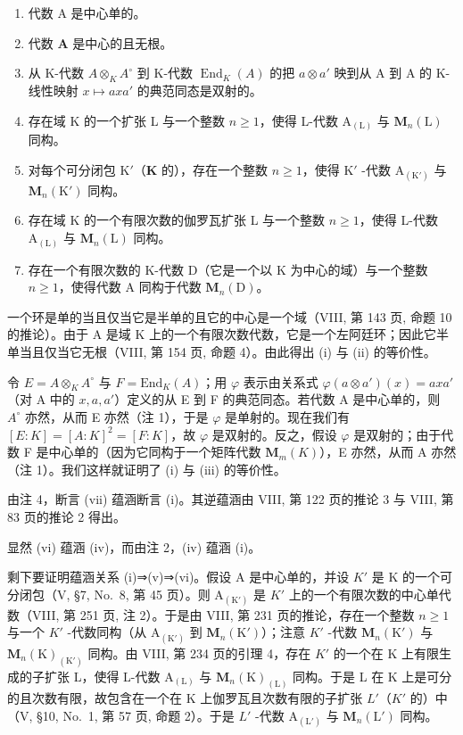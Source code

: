 \begin{enumerate}
\def\labelenumi{(\roman{enumi})}
\item
  代数 A 是中心单的。
\item
  代数 \(\mathbf{A}\) 是中心的且无根。
\item
  从 K-代数 \(A \otimes_{K} A^{\circ}\) 到 K-代数 \(\operatorname{End}_{K}(A)\) 的把 \(a \otimes a'\) 映到从 A 到 A 的 K-线性映射 \(x \mapsto axa'\) 的典范同态是双射的。
\item
  存在域 K 的一个扩张 L 与一个整数 \(n \geqslant 1\)，使得 L-代数 \(\mathrm{A}_{(\mathrm{L})}\) 与 \(\mathbf{M}_{n}(\mathrm{L})\) 同构。
\item
  对每个可分闭包 \(\mathrm{K}'\)（\(\mathbf{K}\) 的），存在一个整数 \(n \geqslant 1\)，使得 \(\mathrm{K}'\) -代数 \(\mathrm{A}_{(\mathrm{K}')}\) 与 \(\mathbf{M}_n(\mathrm{K}')\) 同构。
\item
  存在域 K 的一个有限次数的伽罗瓦扩张 L 与一个整数 \(n \geqslant 1\)，使得 L-代数 \(\mathrm{A}_{(\mathrm{L})}\) 与 \(\mathbf{M}_n(\mathrm{L})\) 同构。
\item
  存在一个有限次数的 K-代数 D（它是一个以 K 为中心的域）与一个整数 \(n \geqslant 1\)，使得代数 A 同构于代数 \(\mathbf{M}_{n}(\mathrm{D})\)。
\end{enumerate}

一个环是单的当且仅当它是半单的且它的中心是一个域（VIII, 第 143 页, 命题 10 的推论）。由于 A 是域 K 上的一个有限次数代数，它是一个左阿廷环；因此它半单当且仅当它无根（VIII, 第 154 页, 命题 4）。由此得出 (i) 与 (ii) 的等价性。

令 \(E = A \otimes_{K} A^{\circ}\) 与 \(F = \text{End}_{K}(A)\)；用 \(\varphi\) 表示由关系式 \(\varphi(a \otimes a')(x) = axa'\)（对 A 中的 \(x, a, a'\)）定义的从 E 到 F 的典范同态。若代数 A 是中心单的，则 \(A^{\circ}\) 亦然，从而 E 亦然（注 1），于是 \(\varphi\) 是单射的。现在我们有 \([E : K] = [A : K]^{2} = [F : K]\)，故 \(\varphi\) 是双射的。反之，假设 \(\varphi\) 是双射的；由于代数 F 是中心单的（因为它同构于一个矩阵代数 \(\mathbf{M}_{m}(K)\)），E 亦然，从而 A 亦然（注 1）。我们这样就证明了 (i) 与 (iii) 的等价性。

由注 4，断言 (vii) 蕴涵断言 (i)。其逆蕴涵由 VIII, 第 122 页的推论 3 与 VIII, 第 83 页的推论 2 得出。

显然 (vi) 蕴涵 (iv)，而由注 2，(iv) 蕴涵 (i)。

剩下要证明蕴涵关系 (i)⇒(v)⇒(vi)。假设 A 是中心单的，并设 \(K'\) 是 K 的一个可分闭包（V, §7, No.~8, 第 45 页）。则 \(\mathrm{A}_{(\mathrm{K}')}\) 是 \(K'\) 上的一个有限次数的中心单代数（VIII, 第 251 页, 注 2）。于是由 VIII, 第 231 页的推论，存在一个整数 \(n \geqslant 1\) 与一个 \(K'\) -代数同构（从 \(\mathrm{A}_{(\mathrm{K}')}\) 到 \(\mathbf{M}_{n}(\mathrm{K}')\)）；注意 \(K'\) -代数 \(\mathbf{M}_{n}(\mathrm{K}')\) 与 \(\mathbf{M}_{n}(\mathrm{K})_{(\mathrm{K}')}\) 同构。由 VIII, 第 234 页的引理 4，存在 \(K'\) 的一个在 K 上有限生成的子扩张 L，使得 L-代数 \(\mathrm{A}_{(\mathrm{L})}\) 与 \(\mathbf{M}_{n}(\mathrm{K})_{(\mathrm{L})}\) 同构。于是 L 在 K 上是可分的且次数有限，故包含在一个在 K 上伽罗瓦且次数有限的子扩张 \(L'\)（\(K'\) 的）中（V, §10, No.~1, 第 57 页, 命题 2）。于是 \(L'\) -代数 \(\mathrm{A}_{(\mathrm{L}')}\) 与 \(\mathbf{M}_{n}(\mathrm{L}')\) 同构。

